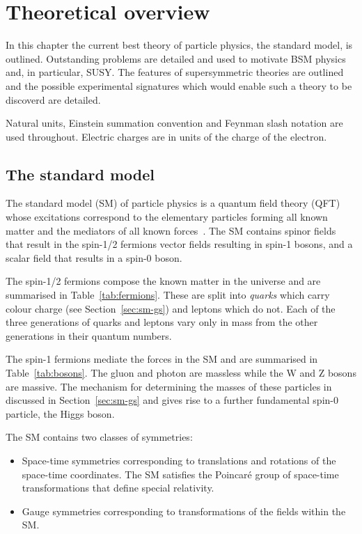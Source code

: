 \chapter{Theoretical overview}
\label{cha:theory}

In this chapter the current best theory of particle physics, the standard model,
is outlined. Outstanding problems are detailed and used to motivate BSM 
physics and, in particular, SUSY. The features of supersymmetric theories are 
outlined and the possible 
experimental signatures which would enable such a theory to be 
discoverd are detailed.

Natural units, Einstein summation convention
and Feynman slash notation are used throughout. Electric charges 
are in units of the charge of the electron.

\section{The standard model}

\label{sec:sm}
The standard model (SM) of particle physics is a quantum field theory (QFT) whose excitations
correspond to the elementary particles forming all known matter and the mediators of
all known forces~\cite{ftsm}. The SM contains spinor fields that result in the spin-1/2 fermions
vector fields resulting in spin-1 bosons, and a scalar field that results in a spin-0
boson. 

The spin-1/2 fermions compose the known matter in the universe and are summarised 
in Table~\ref{tab:fermions}. These are split into \emph{quarks} which carry colour charge 
(see Section~\ref{sec:sm-gs}) and leptons which do not. Each of the three generations of quarks and leptons vary only in
mass from the other generations in their quantum numbers.

The spin-1 fermions mediate the forces in the SM and are summarised in Table~\ref{tab:bosons}. 
The gluon and photon are massless while the W and Z bosons are massive. 
The mechanism for determining the masses of these particles in discussed in 
Section~\ref{sec:sm-gs} and gives rise to a further fundamental spin-0 particle, the Higgs boson.

The SM contains two classes of symmetries:

\begin{itemize}
\item Space-time symmetries corresponding to translations and rotations of the space-time coordinates.
The SM satisfies the Poincar\'{e} group of space-time transformations that define special relativity. 
\item Gauge symmetries corresponding to transformations of the fields within the SM.
\end{itemize}

